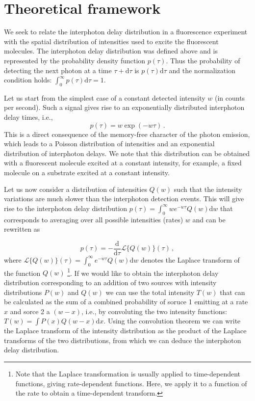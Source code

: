 \section{Theoretical framework}

We seek to relate the interphoton delay distribution in a fluorescence experiment with 
the spatial distribution of intensities used to excite the fluorescent molecules. The interphoton
delay distribution was defined above and is represented by the probability density function $p(\tau)$. 
Thus the probability of detecting the next photon at a time 
$\tau+\mbox{d}\tau$ is $p(\tau)\mbox{d}\tau$ and the
normalization condition holds: $\int_0^{\infty}{p(\tau)\mbox{d}\tau}=1$.

Let us start from the simplest case of a constant detected intensity $w$ 
(in counts per second). Such a signal gives rise to an exponentially distributed 
interphoton delay times, i.e., 
\begin{equation}
p(\tau)=w\exp(-w\tau)\,.
\label{eq:exponential_distribution}
\end{equation}
This is a direct consequence of the memory-free character of the photon 
emission, which leads to a Poisson distribution of intensities and an 
exponential distribution of interphoton delays. We note that this distribution 
can be obtained with a fluorescent molecule excited at a constant intensity, 
for example, a fixed molecule on a substrate excited at a constant intensity. 

Let us now consider a distribution of intensities $Q(w)$ such that the 
intensity variations are much slower than the interphoton detection events.
This will give rise to the interphoton delay distribution 
$p(\tau)=\int_0^\infty w e^{-w\tau}Q(w)\mbox{d}w$ that corresponds to 
averaging over all possible intensities (rates) $w$ and can be rewritten as

\begin{equation}
p(\tau)=-\frac{\mbox{d}}{\mbox{d}\tau}\mathscr{L}\{Q(w)\}(\tau)\,,
\label{eq:interphoton_delay_distribution}
\end{equation} 
where $\mathscr{L}\{Q(w)\}(\tau)=\int_0^\infty e^{-w\tau}Q(w)\mbox{d}w$ denotes the 
Laplace transform of the function $Q(w)$ \footnote{Note that the Laplace transformation
is usually applied to time-dependent functions, giving rate-dependent functions. 
Here, we apply it to a function of the rate to obtain a time-dependent transform.}. 
If we would like to obtain the interphoton delay distribution 
corresponding to an addition of two sources with intensity distributions $P(w)$ 
and $Q(w)$ we can use the total intensity $T(w)$ that can be calculated as the sum 
of a combined probability of soruce 1 emitting at a rate $x$ and sorce 2 a 
$(w-x)$, i.e., by convoluting the two intensity functions: $T(w)=\int{P(x)Q(w-x)\mbox{d}x}$. 
Using the convolution theorem we can write the Laplace transform of the intensity distribution 
as the product of the Laplace transforms of the two distributions, from which we can deduce 
the interphoton delay distribution.

